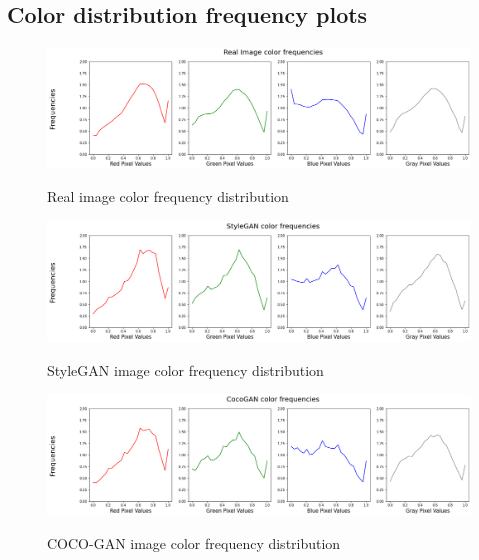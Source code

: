 \documentclass{article}
\begin{document}
    \subsection{Color distribution frequency plots}
     \begin{figure}[H]
          \centering
          \includegraphics[scale=0.35]{color-distributions/real_color_freq.png}\\
          \caption{Real image color frequency distribution}
    \end{figure}
     \begin{figure}[H]
          \centering
          \includegraphics[scale=0.35]{color-distributions/stylegan_color_freq.png}\\
          \caption{StyleGAN image color frequency distribution}
    \end{figure}
     \begin{figure}[H]
          \centering
          \includegraphics[scale=0.35]{color-distributions/cocogan_color_freq.png}\\
          \caption{COCO-GAN image color frequency distribution}
    \end{figure}
\end{document}
